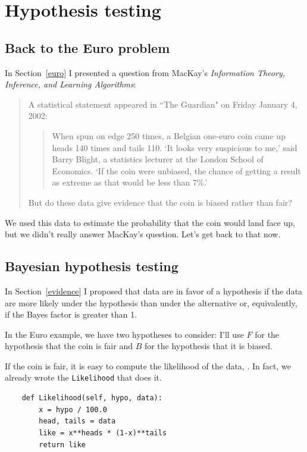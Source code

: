 \documentclass[12pt]{book}
\begin{document}
\chapter{Hypothesis testing}

\section{Back to the Euro problem}

In Section~\ref{euro} I presented a question from MacKay's {\it Information
  Theory, Inference, and Learning Algorithms}:

\begin{quote}
A statistical statement appeared in ``The Guardian" on Friday January 4, 2002:

  \begin{quote}
        When spun on edge 250 times, a Belgian one-euro coin came
        up heads 140 times and tails 110.  `It looks very suspicious
        to me,' said Barry Blight, a statistics lecturer at the London
        School of Economics.  `If the coin were unbiased, the chance of
        getting a result as extreme as that would be less than 7\%.'
        \end{quote}

But do these data give evidence that the coin is biased rather than fair?
\end{quote}

We used this data to estimate the probability that the coin would
land face up, but we didn't really answer MacKay's question.  Let's
get back to that now.

\section{Bayesian hypothesis testing}

In Section~\ref{evidence} I proposed that data are in favor of
a hypothesis if the data are more likely under the hypothesis than
under the alternative or, equivalently, if the Bayes factor is greater
than 1.

In the Euro example, we have two hypotheses to consider: I'll use
$F$ for the hypothesis that the coin is fair and $B$ for the hypothesis
that it is biased.

If the coin is fair, it is easy to compute the likelihood of the
data, .  In fact, we already wrote the {\tt Likelihood}
that does it.

\begin{verbatim}
    def Likelihood(self, hypo, data):
        x = hypo / 100.0
        head, tails = data
        like = x**heads * (1-x)**tails
        return like
\end{verbatim}
\end{document}
